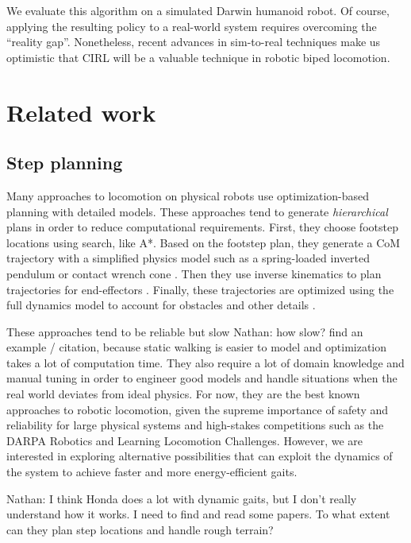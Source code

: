 \documentclass[a4paper]{article}
\newcommand{\nhatch}[1]{{\leavevmode\color{blue} Nathan: #1}}
\begin{document}
We evaluate this algorithm on a simulated Darwin humanoid robot.
Of course, applying the resulting policy to a real-world system requires overcoming the ``reality gap''.
Nonetheless, recent advances in sim-to-real techniques \citep{tan2016simulation, tan2018sim} make us optimistic that CIRL will be a valuable technique in robotic biped locomotion.

\section{Related work}

\subsection{Step planning}

Many approaches to locomotion on physical robots use optimization-based planning with detailed models.
These approaches tend to generate \emph{hierarchical} plans in order to reduce computational requirements.
First, they choose footstep locations using search, like A*.
Based on the footstep plan, they generate a CoM trajectory with a simplified physics model such as a spring-loaded inverted pendulum \citep{mordatch2010robust} or contact wrench cone \citep{dai2016planning}.
Then they use inverse kinematics to plan trajectories for end-effectors \citep{zucker2010optimization}.
Finally, these trajectories are optimized using the full dynamics model to account for obstacles and other details \citep{ratliff2009chomp}.

These approaches tend to be reliable but slow \nhatch{how slow? find an example / citation}, because static walking is easier to model and optimization takes a lot of computation time.
They also require a lot of domain knowledge and manual tuning in order to engineer good models and handle situations when the real world deviates from ideal physics.
For now, they are the best known approaches to robotic locomotion, given the supreme importance of safety and reliability for large physical systems and high-stakes competitions such as the DARPA Robotics and Learning Locomotion Challenges.
However, we are interested in exploring alternative possibilities that can exploit the dynamics of the system to achieve faster and more energy-efficient gaits.

\nhatch{I think Honda does a lot with dynamic gaits, but I don't really understand how it works. I need to find and read some papers. To what extent can they plan step locations and handle rough terrain?}
\end{document}
